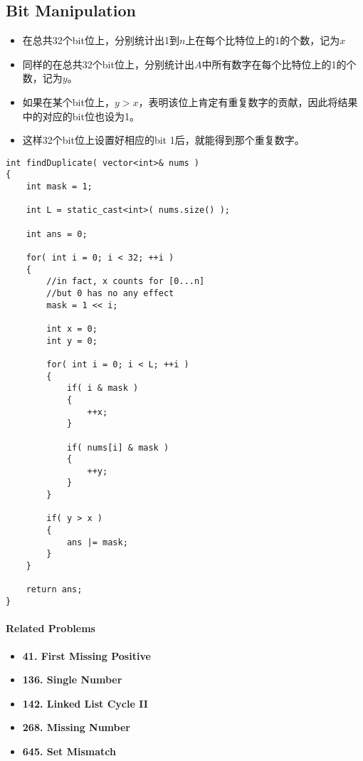 \subsection{Bit Manipulation}
\begin{itemize}
\item 在总共32个bit位上，分别统计出1到$n$上在每个比特位上的1的个数，记为$x$
\item 同样的在总共32个bit位上，分别统计出$A$中所有数字在每个比特位上的1的个数，记为$y$。
\item 如果在某个bit位上，$y>x$，表明该位上肯定有重复数字的贡献，因此将结果中的对应的bit位也设为1。
\item 这样32个bit位上设置好相应的bit 1后，就能得到那个重复数字。
\end{itemize}
\setcounter{lstlisting}{0}
\begin{lstlisting}[style=customc, caption={Bit Manipulation}]
int findDuplicate( vector<int>& nums )
{
    int mask = 1;

    int L = static_cast<int>( nums.size() );

    int ans = 0;

    for( int i = 0; i < 32; ++i )
    {
        //in fact, x counts for [0...n]
        //but 0 has no any effect
        mask = 1 << i;

        int x = 0;
        int y = 0;

        for( int i = 0; i < L; ++i )
        {
            if( i & mask )
            {
                ++x;
            }

            if( nums[i] & mask )
            {
                ++y;
            }
        }

        if( y > x )
        {
            ans |= mask;
        }
    }

    return ans;
}
\end{lstlisting}

\paragraph{Related Problems}
\begin{itemize}
\item \textbf{41. First Missing Positive}
\item \textbf{136. Single Number}
\item \textbf{142. Linked List Cycle II}
\item \textbf{268. Missing Number}
\item \textbf{645. Set Mismatch}
\end{itemize}